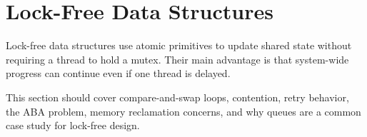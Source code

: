 \section{Lock-Free Data Structures}
Lock-free data structures use atomic primitives to update shared state without requiring a thread to hold a mutex. Their main advantage is that system-wide progress can continue even if one thread is delayed.

This section should cover compare-and-swap loops, contention, retry behavior, the ABA problem, memory reclamation concerns, and why queues are a common case study for lock-free design.
